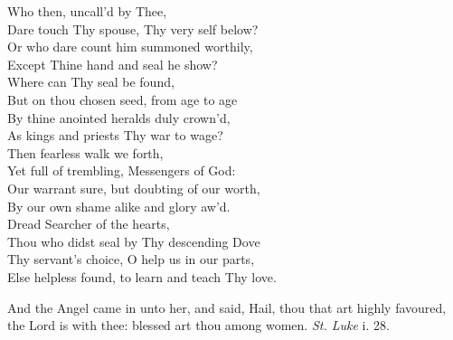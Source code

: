   Who then, uncall’d by Thee, \\
 Dare touch Thy spouse, Thy very self below? \\
 Or who dare count him summoned worthily, \\
 Except Thine hand and seal he show? \\
  Where can Thy seal be found, \\
 But on thou chosen seed, from age to age \\
 By thine anointed heralds duly crown’d, \\
 As kings and priests Thy war to wage? \\
  Then fearless walk we forth, \\
 Yet full of trembling, Messengers of God: \\
 Our warrant sure, but doubting of our worth, \\
 By our own shame alike and glory aw’d. \\
  Dread Searcher of the hearts, \\
 Thou who didst seal by Thy descending Dove \\
 Thy servant’s choice, O help us in our parts, \\
 Else helpless found, to learn and teach Thy love.\\


And the Angel came in unto her, and said, Hail, thou that art highly favoured, the Lord is with thee: blessed art thou among women. \emph{St. Luke} i. 28.

